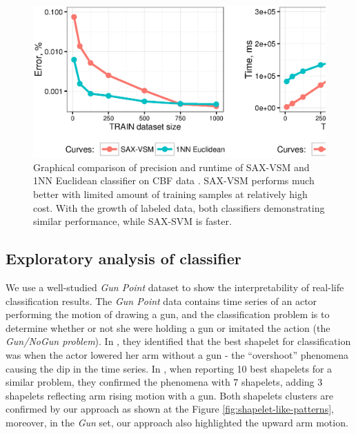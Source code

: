 \documentclass{llncs}
\begin{document}
\subsection{}
\begin{figure}[tbp]
   \centering
   \includegraphics[width=125mm]{figures/precision-runtime.ps}
   \caption{Graphical comparison of precision and runtime of SAX-VSM and 1NN Euclidean classifier on CBF data . 
   SAX-VSM performs much better with limited amount of training samples at relatively high cost. 
   With the growth of labeled data, both classifiers demonstrating similar performance, while SAX-SVM is faster.}
   \label{fig:precision-runtime}
\end{figure}

\subsection{Exploratory analysis of classifier}
We use a well-studied \textit{Gun Point} dataset to show the interpretability of real-life
classification results. The \textit{Gun Point} data contains time series of an actor performing the
motion of drawing a gun, and the classification problem is to determine whether or not she were
holding a gun or imitated the action (the \textit{Gun/NoGun problem}). In \cite{shapelet}, they
identified that the best shapelet for classification was when the actor lowered her arm without a
gun - the ``overshoot'' phenomena causing the dip in the time series. In \cite{bagnal}, when
reporting 10 best shapelets for a similar problem, they confirmed the phenomena with 7 shapelets,
adding 3 shapelets reflecting arm rising motion with a gun. Both shapelets clusters are confirmed by
our approach as shown at the Figure \ref{fig:shapelet-like-patterns}, moreover, in the \textit{Gun}
set, our approach also highlighted the upward arm motion.
\end{document}

